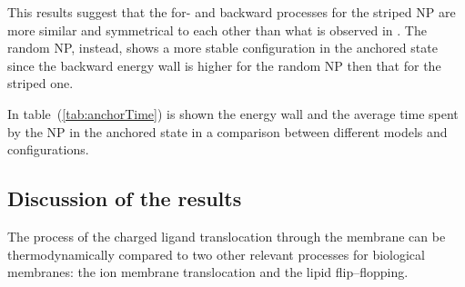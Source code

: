 This results suggest that the for- and backward processes for the striped \ac{NP} are more similar and symmetrical 
to each other than what is observed in \cite{ourPaper}. The random \ac{NP}, instead, shows a more stable 
configuration in the anchored state since the backward energy wall is higher for the random \ac{NP} then that for 
the striped one.

In table~(\ref{tab:anchorTime}) is shown the energy wall and the average time spent by the \ac{NP} in the anchored 
state in a comparison between different models and configurations.

\subsection{Discussion of the results}
The process of the charged ligand translocation through the membrane can be thermodynamically compared to two 
other relevant processes for biological membranes: the ion membrane translocation and the lipid flip--flopping.

